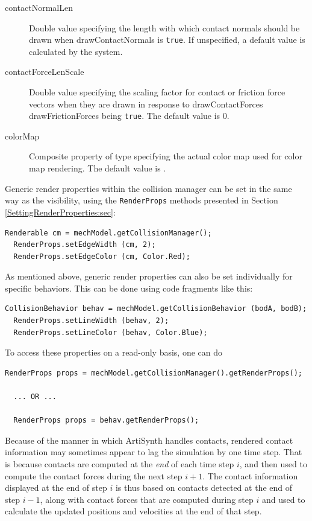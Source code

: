 \begin{description}

\item[contactNormalLen]\mbox{}

Double value specifying the length with which contact normals should
be drawn when {\sf drawContactNormals} is {\tt true}. If unspecified,
a default value is calculated by the system.

\item[contactForceLenScale]\mbox{}

Double value specifying the scaling factor for contact or friction
force vectors when they are drawn in response to {\sf
drawContactForces} {\sf drawFrictionForces} being {\tt true}.  The
default value is 0.

\item[colorMap]\mbox{}

Composite property of type 
specifying the actual color map used for color map rendering.
The default value is 
.

\end{description}


Generic render properties within the collision manager can be
set in the same way as the visibility, using the {\tt RenderProps}
methods presented in Section \ref{SettingRenderProperties:sec}:
\begin{lstlisting}[]
  Renderable cm = mechModel.getCollisionManager();
  RenderProps.setEdgeWidth (cm, 2);
  RenderProps.setEdgeColor (cm, Color.Red);
\end{lstlisting}

As mentioned above, generic render properties can also be set
individually for specific behaviors. This can be done using code
fragments like this:
\begin{lstlisting}[]
  CollisionBehavior behav = mechModel.getCollisionBehavior (bodA, bodB);
  RenderProps.setLineWidth (behav, 2);
  RenderProps.setLineColor (behav, Color.Blue);
\end{lstlisting}
To access these properties on a read-only basis, one can do
\begin{lstlisting}[]
  RenderProps props = mechModel.getCollisionManager().getRenderProps();

  ... OR ...

  RenderProps props = behav.getRenderProps();
\end{lstlisting}

\begin{sideblock}
Because of the manner in which ArtiSynth handles contacts, rendered
contact information may sometimes appear to lag the simulation by one
time step. That is because contacts are computed at the {\it end} of
each time step $i$, and then used to compute the contact forces during
the next step $i+1$. The contact information displayed at the end of
step $i$ is thus based on contacts detected at the end of step $i-1$,
along with contact forces that are computed during step $i$ and used to
calculate the updated positions and velocities at the end of that step.
\end{sideblock}

